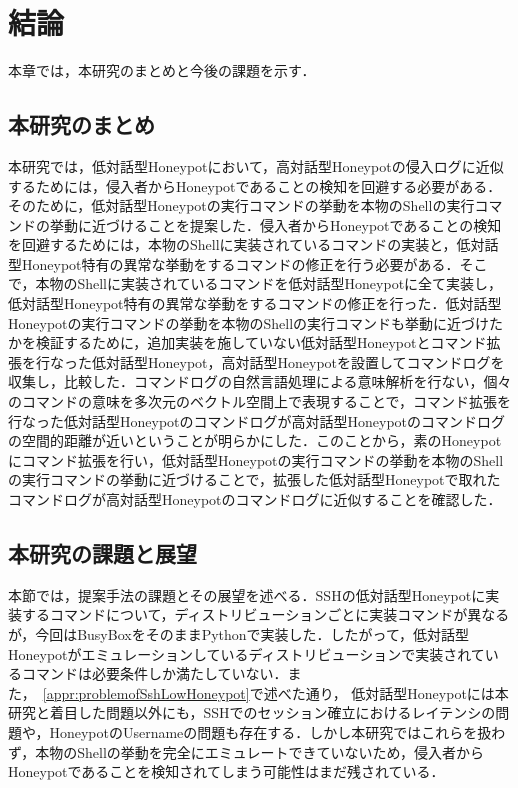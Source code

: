 \chapter{結論}
\label{conc}

本章では，本研究のまとめと今後の課題を示す．

\section{本研究のまとめ}

本研究では，低対話型Honeypotにおいて，高対話型Honeypotの侵入ログに近似するためには，侵入者からHoneypotであることの検知を回避する必要がある．そのために，低対話型Honeypotの実行コマンドの挙動を本物のShellの実行コマンドの挙動に近づけることを提案した．侵入者からHoneypotであることの検知を回避するためには，本物のShellに実装されているコマンドの実装と，低対話型Honeypot特有の異常な挙動をするコマンドの修正を行う必要がある．そこで，本物のShellに実装されているコマンドを低対話型Honeypotに全て実装し，低対話型Honeypot特有の異常な挙動をするコマンドの修正を行った．低対話型Honeypotの実行コマンドの挙動を本物のShellの実行コマンドも挙動に近づけたかを検証するために，追加実装を施していない低対話型Honeypotとコマンド拡張を行なった低対話型Honeypot，高対話型Honeypotを設置してコマンドログを収集し，比較した．コマンドログの自然言語処理による意味解析を行ない，個々のコマンドの意味を多次元のベクトル空間上で表現することで，コマンド拡張を行なった低対話型Honeypotのコマンドログが高対話型Honeypotのコマンドログの空間的距離が近いということが明らかにした．このことから，素のHoneypotにコマンド拡張を行い，低対話型Honeypotの実行コマンドの挙動を本物のShellの実行コマンドの挙動に近づけることで，拡張した低対話型Honeypotで取れたコマンドログが高対話型Honeypotのコマンドログに近似することを確認した．

\section{本研究の課題と展望}
本節では，提案手法の課題とその展望を述べる．SSHの低対話型Honeypotに実装するコマンドについて，ディストリビューションごとに実装コマンドが異なるが，今回はBusyBoxをそのままPythonで実装した．したがって，低対話型Honeypotがエミュレーションしているディストリビューションで実装されているコマンドは必要条件しか満たしていない．また，~\ref{appr:problemofSshLowHoneypot}で述べた通り，
低対話型Honeypotには本研究と着目した問題以外にも，SSHでのセッション確立におけるレイテンシの問題や，HoneypotのUsernameの問題も存在する．しかし本研究ではこれらを扱わず，本物のShellの挙動を完全にエミュレートできていないため，侵入者からHoneypotであることを検知されてしまう可能性はまだ残されている．

